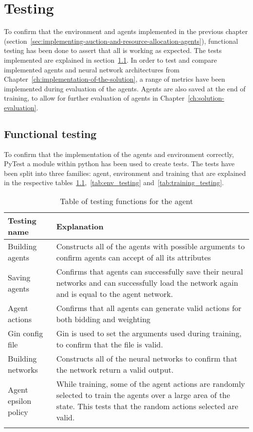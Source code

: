 \chapter{Testing}\label{ch:testing-of-the-implementation}
To confirm that the environment and agents implemented in the previous chapter
(section~\ref{sec:implementing-auction-and-resource-allocation-agents}), functional testing has been done to assert that
all is working as expected. The tests implemented are explained in section~\ref{sec:functional-testing}. In order to
test and compare implemented agents and neural network architectures from Chapter~\ref{ch:implementation-of-the-solution},
a range of metrics have been implemented during evaluation of the agents. Agents are also saved at the end of training,
to allow for further evaluation of agents in Chapter~\ref{ch:solution-evaluation}.

\section{Functional testing}\label{sec:functional-testing}
To confirm that the implementation of the agents and environment correctly, PyTest a module within python has been used
to create tests. The tests have been split into three families: agent, environment and training that are explained
in the respective tables~\ref{tab:agent_testing},~\ref{tab:env_testing} and~\ref{tab:training_testing}.

\begin{longtable}{|p{3cm}|p{11cm}|} \hline
    \textbf{Testing name} & \textbf{Explanation} \\ \hline
    Building agents & Constructs all of the agents with possible arguments to confirm agents can accept of all its
        attributes\\ \hline
    Saving agents & Confirms that agents can successfully save their neural networks and can successfully load
        the network again and is equal to the agent network. \\ \hline
    Agent actions & Confirms that all agents can generate valid actions for both bidding and weighting \\ \hline
    Gin config file & Gin is used to set the arguments used during training, to confirm that the file is valid. \\ \hline
    Building networks & Constructs all of the neural networks to confirm that the network return a valid output. \\ \hline
    Agent epsilon policy & While training, some of the agent actions are randomly selected to train the agents over
        a large area of the state. This tests that the random actions selected are valid. \\ \hline
    \caption{Table of testing functions for the agent}
    \label{tab:agent_testing}
\end{longtable}

